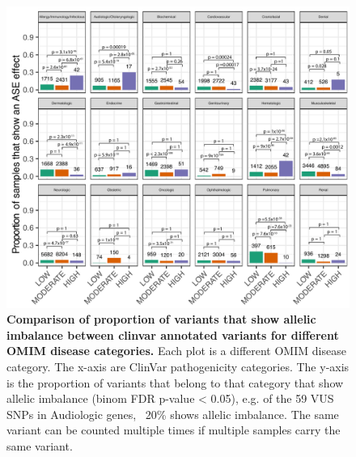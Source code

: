 \begin{figure}[h!]
	\includegraphics[scale=0.1]{chapters/chapter3-allele-specific-expression/img/fig3.pdf}
	\caption{\textbf{Comparison of proportion of variants that show allelic imbalance between clinvar annotated variants for different OMIM disease categories.} Each plot is a different OMIM disease category. The x-axis are ClinVar pathogenicity categories. The y-axis is the proportion of variants that belong to that category that show allelic imbalance (binom FDR p-value < 0.05), e.g. of the 59 VUS SNPs in Audiologic genes, ~20\% shows allelic imbalance. The same variant can be counted multiple times if multiple samples carry the same variant. }
\end{figure}


